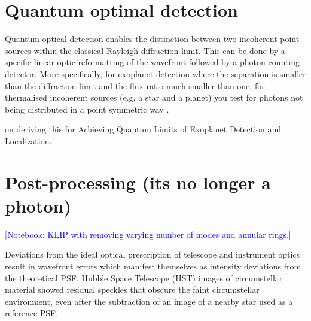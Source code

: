 \documentclass[letterpaper]{ar-1col}
\newcommand{\notebooksuggestion}[1]{\textcolor{blue}{[Notebook: #1]}}
\begin{document}
%


%
%
 



\section{Quantum optimal detection}

Quantum optical detection \citep{Lu18} enables the distinction between two incoherent point sources within the classical Rayleigh diffraction limit.
%
This can be done by a specific linear optic reformatting of the wavefront followed by a photon counting detector.
%
More specifically, for exoplanet detection where the separation is smaller than the diffraction limit and the flux ratio much smaller than one, for thermalised incoherent sources (e.g. a star and a planet) you test for photons not being distributed in a point symmetric way \citep[e.g. ][]{Huang21}.

\citet{Desai23} on deriving this for Achieving Quantum Limits of Exoplanet Detection and Localization.

\section{Post-processing (its no longer a photon)}

\notebooksuggestion{KLIP with removing varying number of modes and annular rings.}

Deviations from the ideal optical prescription of telescope and instrument optics result in wavefront errors which manifest themselves as intensity deviations from the theoretical PSF.
%
Hubble Space Telescope (HST) images of circumstellar material showed residual speckles that obscure the faint circumstellar environment, even after the subtraction of an image of a nearby star used as a reference PSF.
\end{document}
